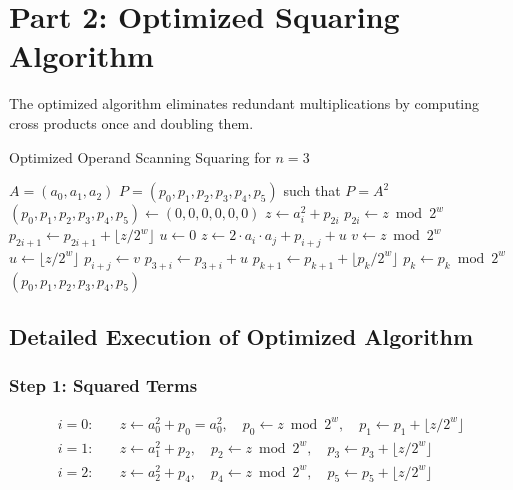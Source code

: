 \documentclass{article}
\begin{document}
\section{Part 2: Optimized Squaring Algorithm}

The optimized algorithm eliminates redundant multiplications by computing cross products once and doubling them.

\begin{algorithm}
\caption{Optimized Operand Scanning Squaring for $n = 3$}
\begin{algorithmic}[1]
\REQUIRE $A = (a_0, a_1, a_2)$
\ENSURE $P = (p_0, p_1, p_2, p_3, p_4, p_5)$ such that $P = A^2$
\STATE $(p_0, p_1, p_2, p_3, p_4, p_5) \leftarrow (0, 0, 0, 0, 0, 0)$
\STATE
{}
    \STATE $z \leftarrow a_i^2 + p_{2i}$
    \STATE $p_{2i} \leftarrow z \bmod 2^w$
    \STATE $p_{2i+1} \leftarrow p_{2i+1} + \lfloor z/2^w \rfloor$
\ENDFOR
\STATE
{}
    \STATE $u \leftarrow 0$
        \STATE $z \leftarrow 2 \cdot a_i \cdot a_j + p_{i+j} + u$
        \STATE $v \leftarrow z \bmod 2^w$
        \STATE $u \leftarrow \lfloor z/2^w \rfloor$
        \STATE $p_{i+j} \leftarrow v$
    \ENDFOR
    \STATE $p_{3+i} \leftarrow p_{3+i} + u$
\ENDFOR
\STATE
{}
        \STATE $p_{k+1} \leftarrow p_{k+1} + \lfloor p_k/2^w \rfloor$
        \STATE $p_k \leftarrow p_k \bmod 2^w$
    \ENDIF
\ENDFOR
\RETURN $(p_0, p_1, p_2, p_3, p_4, p_5)$
\end{algorithmic}
\end{algorithm}

\subsection{Detailed Execution of Optimized Algorithm}

\subsubsection{Step 1: Squared Terms}
\begin{align*}
i = 0: \quad & z \leftarrow a_0^2 + p_0 = a_0^2, \quad p_0 \leftarrow z \bmod 2^w, \quad p_1 \leftarrow p_1 + \lfloor z/2^w \rfloor \\
i = 1: \quad & z \leftarrow a_1^2 + p_2, \quad p_2 \leftarrow z \bmod 2^w, \quad p_3 \leftarrow p_3 + \lfloor z/2^w \rfloor \\
i = 2: \quad & z \leftarrow a_2^2 + p_4, \quad p_4 \leftarrow z \bmod 2^w, \quad p_5 \leftarrow p_5 + \lfloor z/2^w \rfloor
\end{align*}
\end{document}
